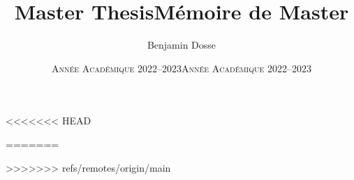 \documentclass[a4paper, 11pt]{article}
\title{Master Thesis}\let\thetitle\@title
\date{\textsc{Année Académique 2022--2023}}\let\thedate\@date
\title{Mémoire de Master}\let\thetitle\@title
\date{\textsc{Année Académique 2022--2023}}\let\thedate\@date
\author{Benjamin Dosse}\let\theauthor\@author
\begin{document}
\frontmatter
\maketitle
\tableofcontents
\mainmatter
    
    
    
    
\printbibliography
<<<<<<< HEAD
=======
\nocite{*}
>>>>>>> refs/remotes/origin/main
\end{document}
